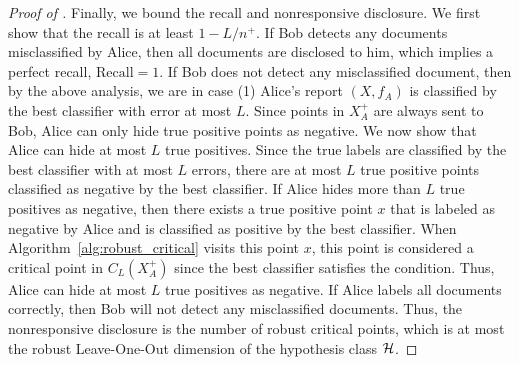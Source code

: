 \begin{proof}[Proof of ]
    Finally, we bound the recall and nonresponsive disclosure. 
    We first show that the recall is at least $1-L/n^+$. 
    If Bob detects any documents misclassified by Alice, then all documents are disclosed to him, which implies a perfect recall, $\mathrm{Recall} = 1$. 
    If Bob does not detect any misclassified document, then by the above analysis, we are in case (1) Alice's report $(X,f_A)$ is classified by the best classifier with error at most $L$.
    Since points in $X_A^+$ are always sent to Bob, Alice can only hide true positive points as negative.
    We now show that Alice can hide at most $L$ true positives.
    Since the true labels are classified by the best classifier with at most $L$ errors, there are at most $L$ true positive points classified as negative by the best classifier.
    If Alice hides more than $L$ true positives as negative, then there exists a true positive point $x$ that is labeled as negative by Alice and is classified as positive by the best classifier.
    When Algorithm~\ref{alg:robust_critical} visits this point $x$, this point is considered a critical point in $C_L(X_A^+)$ since the best classifier satisfies the condition.
    Thus, Alice can hide at most $L$ true positives as negative.
    If Alice labels all documents correctly, then Bob will not detect any misclassified documents. Thus, the nonresponsive disclosure is the number of robust critical points, which is at most the robust Leave-One-Out dimension of the hypothesis class $\mathcal{H}$. 
    
\end{proof}


